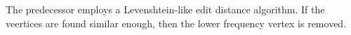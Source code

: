 \documentclass[conference]{IEEEtran}
\begin{document}
The predecessor employs a Levenshtein-like edit distance algorithm. If the veertices are found similar enough, then the lower frequency vertex is removed. 

 


\end{document}
